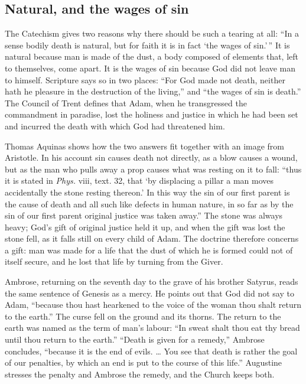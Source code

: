 \subsection{Natural, and the wages of sin}

The Catechism gives two reasons why there should be such a tearing at all: ``In a sense bodily death is natural, but for faith it is in fact `the wages of sin.'\,'' It is natural because man is made of the dust, a body composed of elements that, left to themselves, come apart. It is the wages of sin because God did not leave man to himself. Scripture says so in two places: ``For God made not death, neither hath he pleasure in the destruction of the living,'' and ``the wages of sin is death.'' The Council of Trent defines that Adam, when he transgressed the commandment in paradise, lost the holiness and justice in which he had been set and incurred the death with which God had threatened him.

Thomas Aquinas shows how the two answers fit together with an image from Aristotle. In his account sin causes death not directly, as a blow causes a wound, but as the man who pulls away a prop causes what was resting on it to fall: ``thus it is stated in \emph{Phys.} viii, text. 32, that `by displacing a pillar a man moves accidentally the stone resting thereon.' In this way the sin of our first parent is the cause of death and all such like defects in human nature, in so far as by the sin of our first parent original justice was taken away.'' The stone was always heavy; God's gift of original justice held it up, and when the gift was lost the stone fell, as it falls still on every child of Adam. The doctrine therefore concerns a gift: man was made for a life that the dust of which he is formed could not of itself secure, and he lost that life by turning from the Giver.

Ambrose, returning on the seventh day to the grave of his brother Satyrus, reads the same sentence of Genesis as a mercy. He points out that God did not say to Adam, ``because thou hast hearkened to the voice of the woman thou shalt return to the earth.'' The curse fell on the ground and its thorns. The return to the earth was named as the term of man's labour: ``In sweat shalt thou eat thy bread until thou return to the earth.'' ``Death is given for a remedy,'' Ambrose concludes, ``because it is the end of evils. \ldots{} You see that death is rather the goal of our penalties, by which an end is put to the course of this life.'' Augustine stresses the penalty and Ambrose the remedy, and the Church keeps both.

